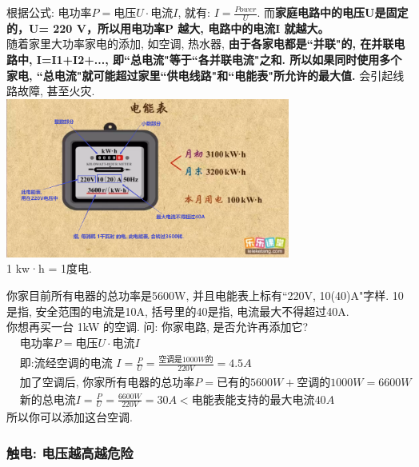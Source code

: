 \documentclass[UTF8]{ctexart}
\begin{document}
	根据公式: $\text{电功率}P=\text{电压}U\cdot \text{电流}I$, 就有: $I=\frac{Power} {U}$. 而\textbf{家庭电路中的电压U是固定的，U= 220 V，所以用电功率P 越大, 电路中的电流I 就越大。} \\
	
	随着家里大功率家电的添加, 如空调, 热水器, \textbf{由于各家电都是``并联"的, 在并联电路中, I=I1+I2+..., 即``总电流"等于``各并联电流"之和. 所以如果同时使用多个家电, ``总电流"就可能超过家里``供电线路"和``电能表"所允许的最大值.} 会引起线路故障, 甚至火灾. \\
	
		\includegraphics[width=0.7\textwidth]{img/0073.png} \\
		1 kw·h = 1度电. \\
	
	
	\begin{tcolorbox}[title = {例},boxrule={0.1em},colframe={black!10}, colback={black!3},colbacktitle={black!10},coltitle={black}]
	你家目前所有电器的总功率是5600W, 并且电能表上标有``220V, 10(40)A"字样. 10是指, 安全范围的电流是10A, 括号里的40是指, 电流最大不得超过40A.  \\
	你想再买一台 1kW 的空调. 问: 你家电路, 是否允许再添加它? 
	\begin{align*}
			&\text{电功率}P=\text{电压}U\cdot \text{电流}I\\
		&\text{即:流经空调的电流\ }I=\frac{P}{U}=\frac{\text{空调是}1000W\text{的}}{220V}=4.5A\\
		&\text{加了空调后,\ 你家所有电器的总功率}P=\text{已有的}5600W+\text{空调的}1000W=6600W\\
		&\text{新的总电流}I=\frac{P}{U}=\frac{6600W}{220V}=30A<\text{电能表能支持的最大电流}40A		
	\end{align*}
所以你可以添加这台空调.	
	\end{tcolorbox}

\vspace{1em} 


\subsubsection{触电: 电压越高越危险}
\end{document}
